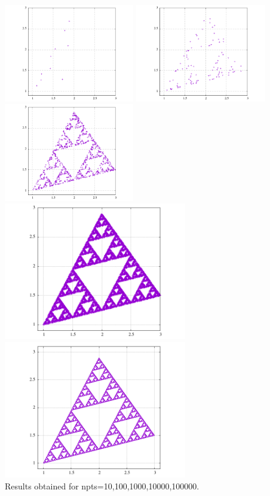 \begin{center}
\includegraphics[width=5.7cm]{python_codes/fieldstone_172/results/pts_10.png}
\includegraphics[width=5.7cm]{python_codes/fieldstone_172/results/pts_100.png}
\includegraphics[width=5.7cm]{python_codes/fieldstone_172/results/pts_1000.png}\\
\includegraphics[width=8cm]{python_codes/fieldstone_172/results/pts_10000.png}
\includegraphics[width=8cm]{python_codes/fieldstone_172/results/pts_100000.png}\\
{\captionfont Results obtained for npts=10,100,1000,10000,100000.}
\end{center}
















